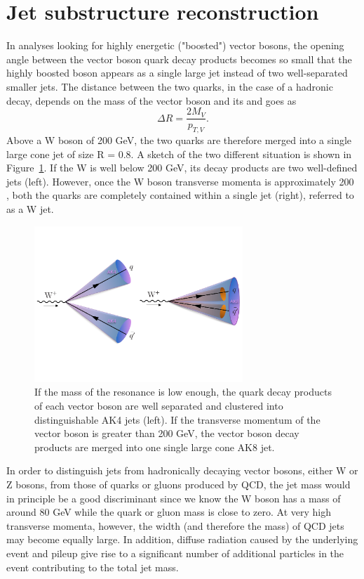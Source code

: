 \section{Jet substructure reconstruction}
\label{sec:objreco:substructure}
In analyses looking for highly energetic ("boosted") vector bosons, the opening angle between the vector boson quark decay products becomes so small that the highly boosted boson appears as a single large jet instead of two well-separated smaller jets. The distance between the two quarks, in the case of a hadronic decay, depends on the mass of the vector boson and its \PT and goes as
\begin{equation}  
\Delta R = \frac{2 M_{V}}{p_{T,V}}.  
\end{equation}
Above a W boson \PT of 200 GeV, the two quarks are therefore merged into a single large cone jet of size R = 0.8. A sketch of the two different situation is shown in Figure~\ref{fig:objreco:mergedvsunmerged}. If the W \PT is well below 200 GeV, its decay products are two well-defined jets (left). However, once the W boson transverse momenta is approximately 200 \GeV, both the quarks are completely contained within a single jet (right), referred to as a W jet.
\begin{figure}[h!] 
    \centering
    \includegraphics[width=0.70\textwidth]{figures/event_reconstruction/merged_vs_unmerged.pdf}
    \caption{If the mass of the resonance is low enough, the quark decay products of each vector boson are well separated and clustered into distinguishable AK4 jets (left). If the transverse momentum of the vector boson is greater than 200 GeV, the vector boson decay products are merged into one single large cone AK8 jet.}
    \label{fig:objreco:mergedvsunmerged}
\end{figure}
In order to distinguish jets from hadronically decaying vector bosons, either W or Z bosons, from those of quarks or gluons produced by QCD, the jet mass would in principle be a good discriminant since we know the W boson has a mass of around 80 GeV while the quark or gluon mass is close to zero. At very high transverse momenta, however, the width (and therefore the mass) of QCD jets may become equally large. In addition, diffuse radiation caused by the underlying event and pileup give rise to a significant number of additional particles in the event contributing to the total jet mass.

